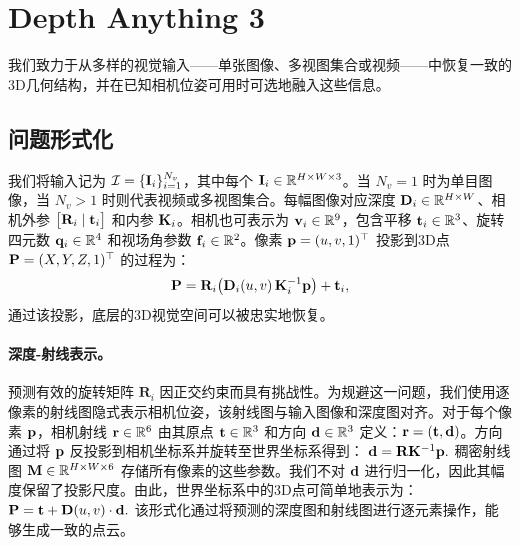 


\section{Depth Anything 3}
\label{sec:method}


我们致力于从多样的视觉输入——单张图像、多视图集合或视频——中恢复一致的3D几何结构，并在已知相机位姿可用时可选地融入这些信息。

\subsection{问题形式化}
\label{sec:formulation}


我们将输入记为 $\mathcal{I}=\{\mathbf{I}_i\}_{i=1}^{N_v}$，其中每个 $\mathbf{I}_i \in \mathbb{R}^{H \times W \times 3}$。当 $N_v=1$ 时为单目图像，当 $N_v>1$ 时则代表视频或多视图集合。每幅图像对应深度 $\mathbf{D}_i \in \mathbb{R}^{H \times W}$、相机外参 $\big[\mathbf{R}_i \mid \mathbf{t}_i\big]$ 和内参 $\mathbf{K}_i$。相机也可表示为 $\mathbf{v}_i \in \mathbb{R}^9$，包含平移 $\mathbf{t}_i\in \mathbb{R}^3$、旋转四元数 $\mathbf{q}_i\in \mathbb{R}^4$ 和视场角参数 $\mathbf{f}_i\in \mathbb{R}^2$。像素 $\mathbf{p}=(u,v,1)^\top$ 投影到3D点 $\mathbf{P}=(X,Y,Z,1)^\top$ 的过程为：
\begin{equation*}
    \mathbf{P}=\mathbf{R}_i\big(\mathbf{D}_i(u,v)\,\mathbf{K}_i^{-1}\mathbf{p}\big)+\mathbf{t}_i,
\end{equation*}
通过该投影，底层的3D视觉空间可以被忠实地恢复。



\paragraph{深度-射线表示。} 预测有效的旋转矩阵 $\mathbf{R}_i$ 因正交约束而具有挑战性。为规避这一问题，我们使用逐像素的射线图隐式表示相机位姿，该射线图与输入图像和深度图对齐。对于每个像素 $\mathbf{p}$，相机射线 $\mathbf{r} \in \mathbb{R}^6$ 由其原点 $\mathbf{t} \in \mathbb{R}^3$ 和方向 $\mathbf{d} \in \mathbb{R}^3$ 定义：$\mathbf{r} = (\mathbf{t}, \mathbf{d})$。方向通过将 $\mathbf{p}$ 反投影到相机坐标系并旋转至世界坐标系得到：
$
    \mathbf{d} = \mathbf{R} \mathbf{K}^{-1} \mathbf{p}.
$
稠密射线图 $\mathbf{M} \in \mathbb{R}^{H \times W \times 6}$ 存储所有像素的这些参数。我们不对 $\mathbf{d}$ 进行归一化，因此其幅度保留了投影尺度。由此，世界坐标系中的3D点可简单地表示为：
$
    {\mathbf{P}} = {\mathbf{t}} + \mathbf{D}(u, v) \cdot \mathbf{d}.
    \label{eq:depth_to_pcd}
$
该形式化通过将预测的深度图和射线图进行逐元素操作，能够生成一致的点云。





